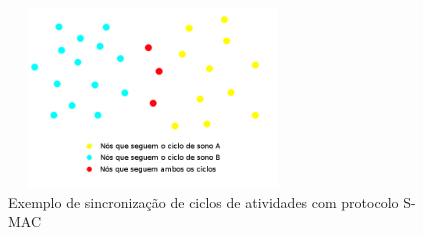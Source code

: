 \begin{figure}[!htb]
\centering
\includegraphics[width=290px,height=180px]{./Pictures/S-MACSynchronization.png}
\caption{Exemplo de sincronização de ciclos de atividades com protocolo S-MAC} %
\label{fig:SmacSynch} %
\end{figure}
 
 



% 

